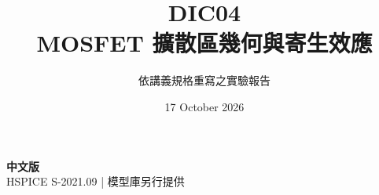 \documentclass[11pt,a4paper]{article}
\title{\color{accent}DIC04\\[4pt]MOSFET 擴散區幾何與寄生效應}
\author{依講義規格重寫之實驗報告}
\date{17 October 2026}
\begin{document}
\maketitle
\begin{center}\small\textbf{中文版}\\
HSPICE S-2021.09 \quad | \quad 模型庫另行提供
\end{center}


\end{document}
